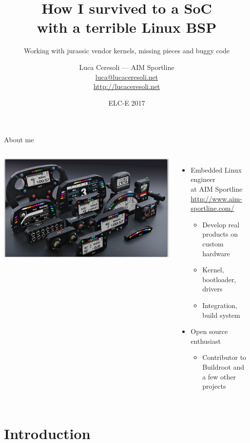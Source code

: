 \documentclass[xetex,table,aspectratio=169]{beamer}
\title{How I survived to a SoC\\with a terrible Linux BSP}
\subtitle{Working with jurassic vendor kernels, missing pieces and buggy code}
\author{Luca Ceresoli --- AIM Sportline\\
  \href{mailto:luca@lucaceresoli.net}{luca@lucaceresoli.net}\\
  \url{http://lucaceresoli.net}
}
\date{ELC-E 2017}
\begin{document}
\maketitle

\begin{frame}{About me}
  \begin{columns}
    \includegraphics[width=\textwidth]{images/aim-products.jpg}

    \begin{itemize}
    \item Embedded Linux engineer\\
      at AIM Sportline\\
      {\footnotesize\url{http://www.aim-sportline.com/}}
      \begin{itemize}
      \item Develop real products on custom hardware
      \item Kernel, bootloader, drivers
      \item Integration, build system
      \end{itemize}
    \item Open source enthusiast
      \begin{itemize}
      \item Contributor to Buildroot and a few other projects
      \end{itemize}
    \end{itemize}
  \end{columns}
\end{frame}

\section{Introduction}
\end{document}
